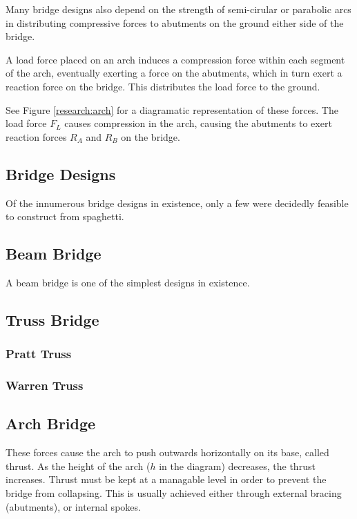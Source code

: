 \documentclass[a4paper,11pt]{article}
\begin{document}
Many bridge designs also depend on the strength of semi-cirular or parabolic
arcs in distributing compressive forces to abutments on the ground either side
of the bridge.

A load force placed on an arch induces a compression force within each segment
of the arch, eventually exerting a force on the abutments, which in turn exert
a reaction force on the bridge.
This distributes the load force to the ground.

See Figure \ref{research:arch} for a diagramatic representation of these forces.
The load force $F_L$ causes compression in the arch, causing the abutments to
exert reaction forces $R_A$ and $R_B$ on the bridge.


\subsection{Bridge Designs}

Of the innumerous bridge designs in existence, only a few were decidedly
feasible to construct from spaghetti.


\subsection{Beam Bridge}

A beam bridge is one of the simplest designs in existence.


\subsection{Truss Bridge}

\subsubsection{Pratt Truss}

\subsubsection{Warren Truss}

\subsection{Arch Bridge}

These forces cause the arch to push outwards horizontally on its base, called
thrust.
As the height of the arch ($h$ in the diagram) decreases, the thrust increases.
Thrust must be kept at a managable level in order to prevent the bridge from
collapsing.
This is usually achieved either through external bracing (abutments), or
internal spokes.
\end{document}
